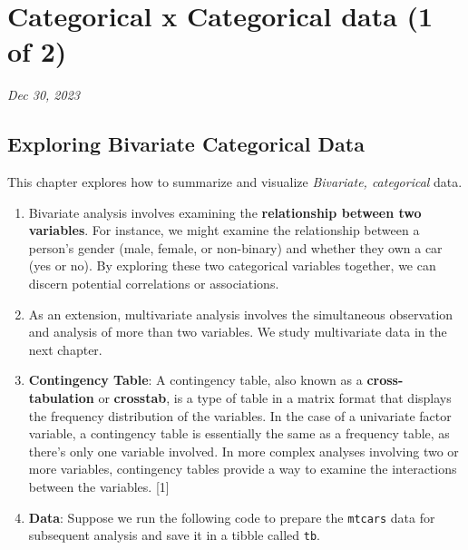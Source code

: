 \documentclass[
  letterpaper,
  DIV=11,
  numbers=noendperiod]{scrreport}
\author{}
\date{}
\begin{document}
\ifdefined\Shaded\renewenvironment{Shaded}{\begin{tcolorbox}[frame hidden, borderline west={3pt}{0pt}{shadecolor}, interior hidden, sharp corners, breakable, enhanced, boxrule=0pt]}{\end{tcolorbox}}\fi

\hypertarget{categorical-x-categorical-data-1-of-2}{%
\chapter{Categorical x Categorical data (1 of
2)}\label{categorical-x-categorical-data-1-of-2}}

\emph{Dec 30, 2023}

\hypertarget{exploring-bivariate-categorical-data}{%
\section{Exploring Bivariate Categorical
Data}\label{exploring-bivariate-categorical-data}}

This chapter explores how to summarize and visualize \emph{Bivariate,
categorical} data.

\begin{enumerate}
\def\labelenumi{\arabic{enumi}.}
\item
  Bivariate analysis involves examining the \textbf{relationship between
  two variables}. For instance, we might examine the relationship
  between a person's gender (male, female, or non-binary) and whether
  they own a car (yes or no). By exploring these two categorical
  variables together, we can discern potential correlations or
  associations.
\item
  As an extension, multivariate analysis involves the simultaneous
  observation and analysis of more than two variables. We study
  multivariate data in the next chapter.
\item
  \textbf{Contingency Table}: A contingency table, also known as a
  \textbf{cross-tabulation} or \textbf{crosstab}, is a type of table in
  a matrix format that displays the frequency distribution of the
  variables. In the case of a univariate factor variable, a contingency
  table is essentially the same as a frequency table, as there's only
  one variable involved. In more complex analyses involving two or more
  variables, contingency tables provide a way to examine the
  interactions between the variables. {[}1{]}
\item
  \textbf{Data}: Suppose we run the following code to prepare the
  \texttt{mtcars} data for subsequent analysis and save it in a tibble
  called \texttt{tb}.
\end{enumerate}
\end{document}
